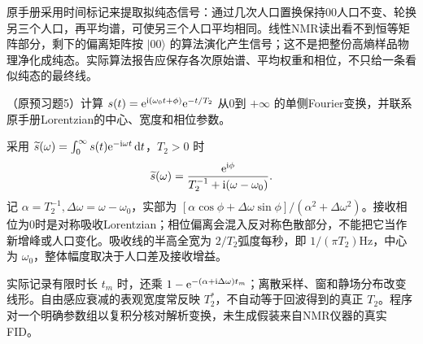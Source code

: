 \begin{solution}
原手册采用时间标记来提取拟纯态信号：通过几次人口置换保持00人口不变、轮换另三个人口，再平均谱，可使另三个人口平均相同。线性NMR读出看不到恒等矩阵部分，剩下的偏离矩阵按 $|00\rangle$ 的算法演化产生信号；这不是把整份高熵样品物理净化成纯态。实际算法报告应保存各次原始谱、平均权重和相位，不只给一条看似纯态的最终线。
\end{solution}

\begin{exercise}
（原预习题5）计算 $s(t)=\mathrm e^{\mathrm i(\omega_0t+\phi)}\mathrm e^{-t/T_2}$ 从0到 $+\infty$ 的单侧Fourier变换，并联系原手册Lorentzian的中心、宽度和相位参数。
\end{exercise}
\begin{solution}
采用 $\widetilde s(\omega)=\int_0^\infty s(t)\mathrm e^{-\mathrm i\omega t}\,\mathrm d t$，$T_2>0$ 时
\[
 \widetilde s(\omega)=\frac{\mathrm e^{\mathrm i\phi}}{T_2^{-1}+\mathrm i(\omega-\omega_0)}.
\]
记 $\alpha=T_2^{-1},\Delta\omega=\omega-\omega_0$，实部为 $[\alpha\cos\phi+\Delta\omega\sin\phi]/(\alpha^2+\Delta\omega^2)$。接收相位为0时是对称吸收Lorentzian；相位偏离会混入反对称色散部分，不能把它当作新增峰或人口变化。吸收线的半高全宽为 $2/T_2$弧度每秒，即 $1/(\pi T_2)$Hz，中心为 $\omega_0$，整体幅度取决于人口差及接收增益。

实际记录有限时长 $t_m$ 时，还乘 $1-\mathrm e^{-(\alpha+\mathrm i\Delta\omega)t_m}$；离散采样、窗和静场分布改变线形。自由感应衰减的表观宽度常反映 $T_2^*$，不自动等于回波得到的真正 $T_2$。程序对一个明确参数组以复积分核对解析变换，未生成假装来自NMR仪器的真实FID。
\end{solution}
